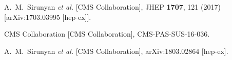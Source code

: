 \documentclass[aps,prd,superscriptaddress,twocolumn,secnumarabic]{revtex4-1}
\begin{document}
\begin{thebibliography}{99}
  A.~M.~Sirunyan {\it et al.} [CMS Collaboration],
  JHEP {\bf 1707}, 121 (2017)
  [arXiv:1703.03995 [hep-ex]].


  CMS Collaboration [CMS Collaboration],
  CMS-PAS-SUS-16-036.


  A.~M.~Sirunyan {\it et al.} [CMS Collaboration],
  arXiv:1803.02864 [hep-ex].
\end{thebibliography}
\end{document}

